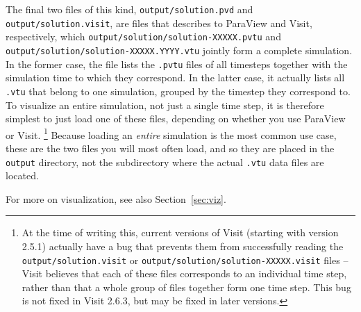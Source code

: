\documentclass{article}
\begin{document}
\begin{itemize}
  The final two files of this kind, \texttt{output/solution.pvd} and
  \texttt{output/solution.visit}, are files that
  describes to ParaView and Visit, respectively, which
  \texttt{output/solution/solution-XXXXX.pvtu} and
  \texttt{output/solution/solution-XXXXX.YYYY.vtu} jointly form a complete
  simulation.
  In the former case, the file lists the \texttt{.pvtu} files of all
  timesteps together with the simulation time to which they correspond. In the
  latter case, it actually lists all \texttt{.vtu} that belong to one
  simulation, grouped by the timestep they correspond to.
  To visualize an entire simulation, not just a single time step, it is
  therefore simplest to just load one of these files, depending on whether you
  use ParaView or Visit.%
  \footnote{At the time of writing this, current versions of Visit (starting
    with version 2.5.1) actually have a bug that prevents them from
    successfully reading the \texttt{output/solution.visit} or
    \texttt{output/solution/solution-XXXXX.visit} files -- Visit believes that
    each of these files corresponds to an individual time step, rather than that a whole
    group of files together form one time step. This bug is not fixed in Visit
    2.6.3, but may be fixed in later versions.}
  Because loading an \textit{entire} simulation is the most common use case,
  these are the two files you will most often load, and so they are placed in
  the \texttt{output} directory, not the subdirectory where the actual
  \texttt{.vtu} data files are located.

  For more on visualization, see also Section~\ref{sec:viz}.


\end{itemize}
\end{document}
